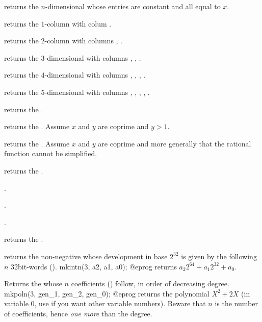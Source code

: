 returns the $n$-dimensional  whose entries are constant and all
equal to $x$.

returns the $1$-column  with colum .

returns the $2$-column  with columns , .

returns the $3$-dimensional  with columns
, , .

returns the $4$-dimensional  with columns
, , , .

returns the $5$-dimensional  with columns
, , , , .

returns the  .

returns the  . Assume $x$ and $y$ are coprime and $y > 1$.

returns the  . Assume $x$ and $y$ are coprime and more
generally that the rational function cannot be simplified.

returns the  .

.

.

.

returns the  .

\smallskip

 returns the non-negative  whose
development in base $2^{32}$ is given by the following $n$ 32bit-words
().
\bprog
  mkintn(3, a2, a1, a0);
@eprog
\noindent returns $a_2 2^{64} + a_1 2^{32} + a_0$.

 Returns the  whose $n$
coefficients () follow, in order of decreasing degree.
\bprog
  mkpoln(3, gen_1, gen_2, gen_0);
@eprog
\noindent returns the polynomial $X^2 + 2X$ (in variable $0$, use
 if you want other variable numbers). Beware that $n$ is the
number of coefficients, hence \emph{one more} than the degree.

